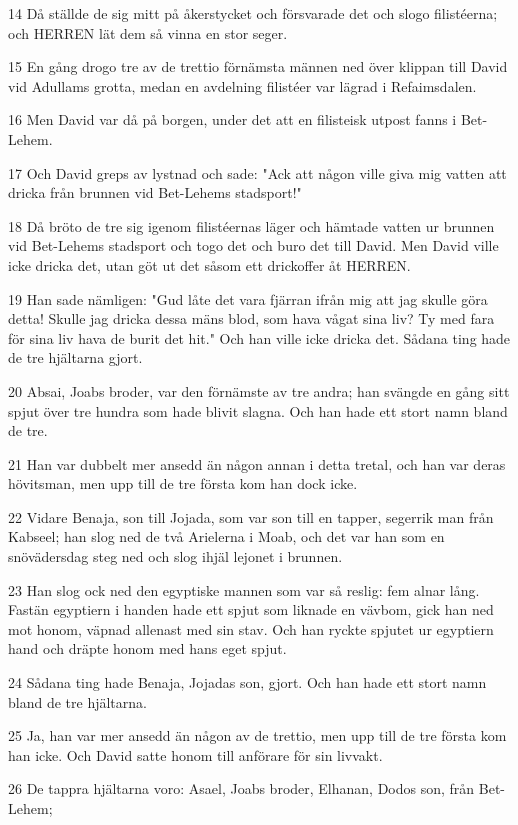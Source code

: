 \par 14 Då ställde de sig mitt på åkerstycket och försvarade det och slogo filistéerna; och HERREN lät dem så vinna en stor seger.
\par 15 En gång drogo tre av de trettio förnämsta männen ned över klippan till David vid Adullams grotta, medan en avdelning filistéer var lägrad i Refaimsdalen.
\par 16 Men David var då på borgen, under det att en filisteisk utpost fanns i Bet-Lehem.
\par 17 Och David greps av lystnad och sade: "Ack att någon ville giva mig vatten att dricka från brunnen vid Bet-Lehems stadsport!"
\par 18 Då bröto de tre sig igenom filistéernas läger och hämtade vatten ur brunnen vid Bet-Lehems stadsport och togo det och buro det till David. Men David ville icke dricka det, utan göt ut det såsom ett drickoffer åt HERREN.
\par 19 Han sade nämligen: "Gud låte det vara fjärran ifrån mig att jag skulle göra detta! Skulle jag dricka dessa mäns blod, som hava vågat sina liv? Ty med fara för sina liv hava de burit det hit." Och han ville icke dricka det. Sådana ting hade de tre hjältarna gjort.
\par 20 Absai, Joabs broder, var den förnämste av tre andra; han svängde en gång sitt spjut över tre hundra som hade blivit slagna. Och han hade ett stort namn bland de tre.
\par 21 Han var dubbelt mer ansedd än någon annan i detta tretal, och han var deras hövitsman, men upp till de tre första kom han dock icke.
\par 22 Vidare Benaja, son till Jojada, som var son till en tapper, segerrik man från Kabseel; han slog ned de två Arielerna i Moab, och det var han som en snövädersdag steg ned och slog ihjäl lejonet i brunnen.
\par 23 Han slog ock ned den egyptiske mannen som var så reslig: fem alnar lång. Fastän egyptiern i handen hade ett spjut som liknade en vävbom, gick han ned mot honom, väpnad allenast med sin stav. Och han ryckte spjutet ur egyptiern hand och dräpte honom med hans eget spjut.
\par 24 Sådana ting hade Benaja, Jojadas son, gjort. Och han hade ett stort namn bland de tre hjältarna.
\par 25 Ja, han var mer ansedd än någon av de trettio, men upp till de tre första kom han icke. Och David satte honom till anförare för sin livvakt.
\par 26 De tappra hjältarna voro: Asael, Joabs broder, Elhanan, Dodos son, från Bet-Lehem;
